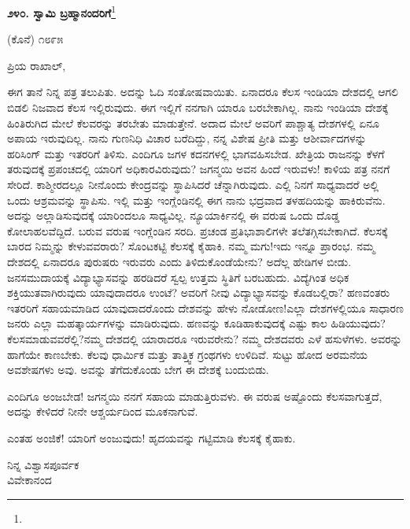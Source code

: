 \newpage

\begin{center}
\textbf{೨೪೦. ಸ್ವಾಮಿ ಬ್ರಹ್ಮಾನಂದರಿಗೆ}\footnote{}
\end{center}

\begin{flushright}
(ಕೊನೆ) ೧೮೯೫
\end{flushright}

\noindent
ಪ್ರಿಯ ರಾಖಾಲ್,

ಈಗ ತಾನೆ ನಿನ್ನ ಪತ್ರ ತಲುಪಿತು. ಅದನ್ನು ಓದಿ ಸಂತೋಷವಾಯಿತು. ಏನಾದರೂ ಕೆಲಸ ಇಂಡಿಯಾ ದೇಶದಲ್ಲಿ ಆಗಲಿ ಬಿಡಲಿ ನಿಜವಾದ ಕೆಲಸ ಇಲ್ಲಿರುವುದು. ಈಗ ಇಲ್ಲಿಗೆ ನನಗಾಗಿ ಯಾರೂ ಬರಬೇಕಾಗಿಲ್ಲ. ನಾನು ಇಂಡಿಯಾ ದೇಶಕ್ಕೆ ಹಿಂತಿರುಗಿದ ಮೇಲೆ ಕೆಲವರನ್ನು ತರಬೇತು ಮಾಡುತ್ತೇನೆ. ಅದಾದ ಮೇಲೆ ಅವರಿಗೆ ಪಾಶ್ಚಾತ್ಯ ದೇಶಗಳಲ್ಲಿ ಏನೂ ಅಪಾಯ ಇರುವುದಿಲ್ಲ. ನಾನು ಗುಣನಿಧಿ ವಿಚಾರ ಬರೆದಿದ್ದು, ನನ್ನ ವಿಶೇಷ ಪ್ರೀತಿ ಮತ್ತು ಆಶೀರ್ವಾದಗಳನ್ನು ಹರಿಸಿಂಗ್ ಮತ್ತು ಇತರರಿಗೆ ತಿಳಿಸು. ಎಂದಿಗೂ ಜಗಳ ಕದನಗಳಲ್ಲಿ ಭಾಗವಹಿಸಬೇಡ. ಖೇತ್ರಿಯ ರಾಜನನ್ನು ಕೆಳಗೆ ತರುವುದಕ್ಕೆ ಪ್ರಪಂಚದಲ್ಲಿ ಯಾರಿಗೆ ಅಧಿಕಾರವಿರುವುದು? ಜಗನ್ಮಯಿ ಅವನ ಹಿಂದೆ ಇರುವಳು! ಕಾಳಿಯ ಪತ್ರ ನನಗೆ ಸೇರಿದೆ. ಕಾಶ್ಮೀರದಲ್ಲೂ ನೀನೊಂದು ಕೇಂದ್ರವನ್ನು ಸ್ಥಾಪಿಸಿದರೆ ಚೆನ್ನಾಗಿರುವುದು. ಎಲ್ಲಿ ನಿನಗೆ ಸಾಧ್ಯವಾದರೆ ಅಲ್ಲಿ ಒಂದು ಆಶ್ರಮವನ್ನು ಸ್ಥಾಪಿಸು. ಇಲ್ಲಿ ಮತ್ತು ಇಂಗ್ಲೆಂಡಿನಲ್ಲಿ ಈಗ ನಾನು ಭದ್ರವಾದ ತಳಹದಿಯನ್ನು ಹಾಕಿರುವೆನು. ಅದನ್ನು ಅಲ್ಲಾಡಿಸುವುದಕ್ಕೆ ಯಾರಿಂದಲೂ ಸಾಧ್ಯವಿಲ್ಲ. ನ್ಯೂಯಾರ್ಕಿನಲ್ಲಿ ಈ ವರುಷ ಒಂದು ದೊಡ್ಡ ಕೋಲಾಹಲವೆದ್ದಿದೆ. ಬರುವ ವರುಷ ಇಂಗ್ಲೆಂಡಿನ ಸರದಿ. ಪ್ರಚಂಡ ಪ್ರತಿಭಾಶಾಲಿಗಳೇ ತಲೆತಗ್ಗಿಸಬೇಕಾಗಿದೆ. ಕೆಲಸಕ್ಕೆ ಬಾರದ ನಿಮ್ಮನ್ನು ಕೇಳುವವರಾರು? ಸೊಂಟಕಟ್ಟಿ ಕೆಲಸಕ್ಕೆ ಕೈಹಾಕಿ. ನಮ್ಮ ಮಗು!ಇದು ಇನ್ನೂ ಪ್ರಾರಂಭ. ನಮ್ಮ ದೇಶದಲ್ಲಿ ಏನಾದರೂ ಪುರುಷರು ಇರುವರು ಎಂದು ತಿಳಿದುಕೊಂಡೆಯೇನು? ಅದೆಲ್ಲ ಹೇಡಿಗಳ ಬೀಡು. ಜನಸಮುದಾಯಕ್ಕೆ ವಿದ್ಯಾಭ್ಯಾಸವನ್ನು ಹರಡಿದರೆ ಸ್ವಲ್ಪ ಉತ್ತಮ ಸ್ಥಿತಿಗೆ ಬರಬಹುದು. ವಿದ್ಯೆಗಿಂತ ಅಧಿಕ ಶಕ್ತಿಯುತವಾಗಿರುವುದು ಯಾವುದಾದರೂ ಉಂಟೆ? ಅವರಿಗೆ ನೀವು ವಿದ್ಯಾಭ್ಯಾಸವನ್ನು ಕೊಡಬಲ್ಲಿರಾ? ಹಣವಂತರು ಇತರರಿಗೆ ಸಹಾಯಮಾಡಿದ ಯಾವುದಾದರೊಂದು ದೇಶವನ್ನು ಹೇಳು ನೋಡೋಣ!ಎಲ್ಲಾ ದೇಶಗಳಲ್ಲಿಯೂ ಸಾಧಾರಣ ಜನರು ಎಲ್ಲಾ ಮಹತ್ಕಾರ್ಯಗಳನ್ನು ಮಾಡಿರುವುದು. ಹಣವನ್ನು ಕೂಡಿಹಾಕುವುದಕ್ಕೆ ಎಷ್ಟು ಕಾಲ ಹಿಡಿಯುವುದು? ಕೆಲಸಮಾಡುವವರೆಲ್ಲಿ?ನಮ್ಮ ದೇಶದಲ್ಲಿ ಯಾರಾದರೂ ಇರುವರೇನು? ನಮ್ಮ ದೇಶದವರು ಎಳೆ ಹಸುಳೆಗಳು. ಅವರನ್ನು ಹಾಗೆಯೇ ಕಾಣಬೇಕು. ಕೆಲವು ಧಾರ್ಮಿಕ ಮತ್ತು ತಾತ್ತ್ವಿಕ ಗ್ರಂಥಗಳು ಉಳಿದಿವೆ. ಸುಟ್ಟು ಹೋದ ಅರಮನೆಯ ಅವಶೇಷಗಳು ಅವು. ಅವನ್ನು ತೆಗೆದುಕೊಂಡು ಬೇಗ ಈ ದೇಶಕ್ಕೆ ಬಂದುಬಿಡು.

ಎಂದಿಗೂ ಅಂಜಬೇಡ! ಜಗನ್ಮಯಿ ನನಗೆ ಸಹಾಯ ಮಾಡುತ್ತಿರುವಳು. ಈ ವರುಷ ಅಷ್ಟೊಂದು ಕೆಲಸವಾಗುತ್ತದೆ, ಅದನ್ನು ಕೇಳಿದರೆ ನೀನೇ ಆಶ್ಚರ್ಯದಿಂದ ಮೂಕನಾಗುವೆ.

ಎಂತಹ ಅಂಜಿಕೆ! ಯಾರಿಗೆ ಅಂಜುವುದು! ಹೃದಯವನ್ನು ಗಟ್ಟಿಮಾಡಿ ಕೆಲಸಕ್ಕೆ ಕೈಹಾಕು.


\vspace{-0.5cm}

\begin{flushright}
ನಿನ್ನ ವಿಶ್ವಾಸಪೂರ್ವಕ\\ವಿವೇಕಾನಂದ
\end{flushright}

